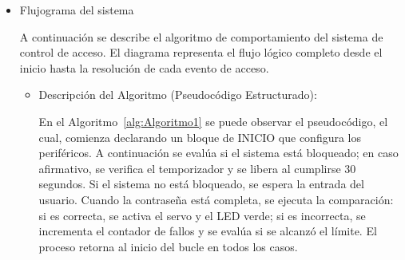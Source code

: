 \begin{itemize}

       \item Flujograma del sistema
       
         A continuación se describe el algoritmo de comportamiento del sistema de control de acceso. El diagrama representa el flujo lógico completo desde el inicio hasta la resolución de cada evento de acceso.

             \begin{itemize}
             
                \item Descripción del Algoritmo (Pseudocódigo Estructurado):

                En el Algoritmo~\ref{alg:Algoritmo1} se puede observar el pseudocódigo, el cual, comienza declarando un bloque de INICIO que configura los periféricos. A continuación se evalúa si el sistema está bloqueado; en caso afirmativo, se verifica el temporizador y se libera al cumplirse 30 segundos. Si el sistema no está bloqueado, se espera la entrada del usuario. Cuando la contraseña está completa, se ejecuta la comparación: si es correcta, se activa el servo y el LED verde; si es incorrecta, se incrementa el contador de fallos y se evalúa si se alcanzó el límite. El proceso retorna al inicio del bucle en todos los casos.

                  
             \end{itemize}
             
\end{itemize}

 


